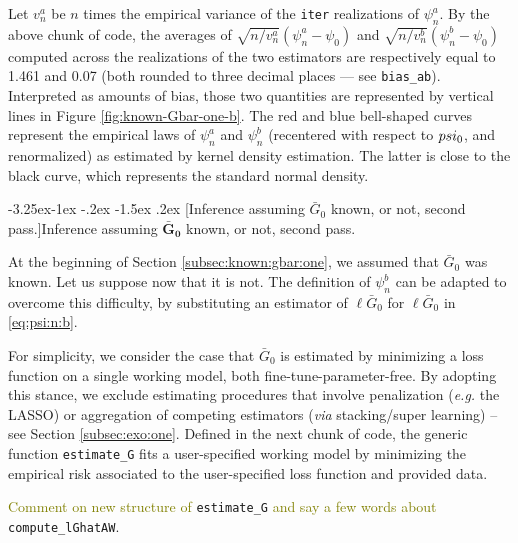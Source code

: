 \documentclass[]{article}
\makeatletter
\renewcommand\subsection{\@startsection{subsection}{3}{\z@}%
                                     {-3.25ex\@plus -1ex \@minus -.2ex}%
                                     {-1.5ex \@plus .2ex}%
                                     {\normalfont\normalsize\bfseries}}
\newcommand{\Gbar}{\bar{G}}
\newcommand{\tcg}[1]{\textcolor{olive}{#1}}
\theoremstyle{definition}
\theoremstyle{definition}
\theoremstyle{definition}
\theoremstyle{remark}
\makeatother
\begin{document}
Let \(v_{n}^{a}\) be \(n\) times the empirical variance of the
\texttt{iter} realizations of \(\psi_{n}^{a}\). By the above chunk of
code, the averages of \(\sqrt{n/v_{n}^{a}} (\psi_{n}^{a} - \psi_{0})\)
and \(\sqrt{n/v_{n}^{b}} (\psi_{n}^{b} - \psi_{0})\) computed across the
realizations of the two estimators are respectively equal to 1.461 and
0.07 (both rounded to three decimal places --- see \texttt{bias\_ab}).
Interpreted as amounts of bias, those two quantities are represented by
vertical lines in Figure \ref{fig:known-Gbar-one-b}. The red and blue
bell-shaped curves represent the empirical laws of \(\psi_{n}^{a}\) and
\(\psi_{n}^{b}\) (recentered with respect to \(\\psi_{0}\), and
renormalized) as estimated by kernel density estimation. The latter is
close to the black curve, which represents the standard normal density.

\subsection[Inference assuming $\Gbar_{0}$ known, or not, second pass.]{Inference assuming
$\boldsymbol{\Gbar_{0}}$ known, or not, second pass.} 
\label{subsec:known:gbar:two}

At the beginning of Section \ref{subsec:known:gbar:one}, we assumed that
\(\Gbar_{0}\) was known. Let us suppose now that it is not. The
definition of \(\psi_{n}^{b}\) can be adapted to overcome this
difficulty, by substituting an estimator of \(\ell\Gbar_{0}\) for
\(\ell\Gbar_{0}\) in \eqref{eq:psi:n:b}.

For simplicity, we consider the case that \(\Gbar_{0}\) is estimated by
minimizing a loss function on a single working model, both
fine-tune-parameter-free. By adopting this stance, we exclude estimating
procedures that involve penalization (\textit{e.g.} the LASSO) or
aggregation of competing estimators (\textit{via} stacking/super
learning) -- see Section \ref{subsec:exo:one}. Defined in the next chunk
of code, the generic function \texttt{estimate\_G} fits a user-specified
working model by minimizing the empirical risk associated to the
user-specified loss function and provided data.

\tcg{Comment on new structure of} \texttt{estimate\_G}
\tcg{and say a few words about} \texttt{compute\_lGhatAW}.
\end{document}
